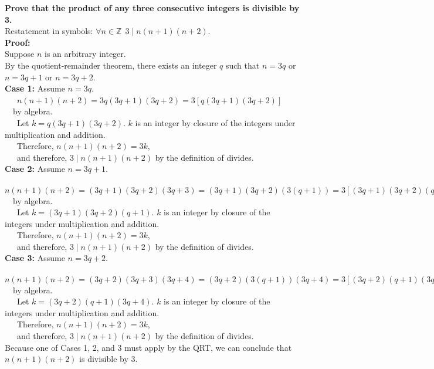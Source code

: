 \documentclass{article}
\newcommand{\Z}{\mathbb{Z}}
\begin{document}
\textbf{Prove that the product of any three consecutive integers is divisible by 3.}
\\

Restatement in symbols: $\forall n \in \Z \ \ 3 \mid n(n+1)(n+2)$.
\\

\textbf{Proof:} \\

Suppose $n$ is an arbitrary integer. \\

By the quotient-remainder theorem, there exists an integer $q$ such that $n=3q$ or $n=3q+1$ or $n=3q+2$.  \\


\textbf{Case 1:} Assume $n=3q$.  \\

\ \ \ $n(n+1)(n+2) = 3q(3q+1)(3q+2) = 3\left[ q(3q+1)(3q+2) \right]$ \ \ by algebra. \\

\ \ \ Let $k=q(3q+1)(3q+2)$.  $k$ is an integer by closure of the integers under multiplication and addition. \\

\ \ \ Therefore, $n(n+1)(n+2) = 3k$, \\ 

\ \ \ and therefore, $3 \mid n(n+1)(n+2)$ by the definition of divides.\\

\textbf{Case 2:} Assume $n=3q+1$.  \\

\ \ \ $n(n+1)(n+2) = (3q+1)(3q+2)(3q+3) = (3q+1)(3q+2)(3(q+1)) = 3\left[ (3q+1)(3q+2)(q+1) \right]$ \ \ by algebra. \\

\ \ \ Let $k=(3q+1)(3q+2)(q+1)$.  $k$ is an integer by closure of the integers under multiplication and addition. \\

\ \ \ Therefore, $n(n+1)(n+2) = 3k$, \\ 

\ \ \ and therefore, $3 \mid n(n+1)(n+2)$ by the definition of divides.\\


\textbf{Case 3:} Assume $n=3q+2$.  \\

\ \ \ $n(n+1)(n+2) = (3q+2)(3q+3)(3q+4) = (3q+2)(3(q+1))(3q+4)= 3\left[ (3q+2)(q+1)(3q+4) \right]$ \ \ by algebra. \\

\ \ \ Let $k=(3q+2)(q+1)(3q+4)$.  $k$ is an integer by closure of the integers under multiplication and addition. \\

\ \ \ Therefore, $n(n+1)(n+2) = 3k$, \\ 

\ \ \ and therefore, $3 \mid n(n+1)(n+2)$ by the definition of divides.\\



Because one of Cases 1, 2, and 3 must apply by the QRT, we can conclude that $n(n+1)(n+2)$ is divisible by 3.
\end{document}
